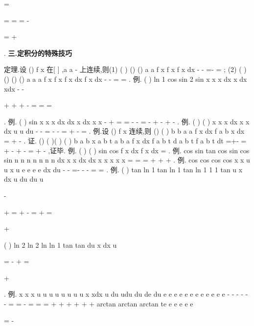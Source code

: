 \cdots 
=

=
=
=
-

=
+

\int 
\int 
. 
\vspace{4pt}
{\bfseries \textcolor{lyred}{三.定积分的特殊技巧}}

\textcolor{lyred}{定理}.设
()
f x 在[
]
,a a
-
上连续,则(1)
(
)
()
()
a
a
f
x
f x
f x dx
-
-
=-
\Rightarrow 
=
\int 
; 
(2)
(
)
()
()
()
a
a
a
f
x
f x
f x dx
f x dx
-
-
=
\Rightarrow 
=
\int 
\int 
. 
\textcolor{lyred}{例}.
(
)
ln
1 cos
sin
2 sin
x
x
x dx
x dx
xdx
\pi 
\pi 
\pi 
\pi 
\pi 
-
-


+
+
+
-
=
=
=




\int 
\int 
\int 
. 
\textcolor{lyred}{例}.
(
)
sin
x
x
x
dx
dx
x
dx
x
x
\pi 
-
+
=
=
-
-
=
-
+
-
+
-
\int 
\int 
\int 
. 
\textcolor{lyred}{例}.
(
)
(
)
x
x
x dx
x
x
dx
u
u du
\pi 
-
-
=
-
-
=
+
-
=
\int 
\int 
\int 
. 
\textcolor{lyred}{例}.设
()
f x 连续,则
()
(
)
b
b
a
a
f x dx
f a
b
x dx
=
+
-
\int 
\int 
. 
证.
()
(
)(
)
(
)
b
a
b
x a b t
a
b
a
f x dx
f a
b
t d a
b
t
f a
b
t dt
=+-
=
+
-
+
-
=
+
-
\int 
\int 
\int 
,证毕. 
\textcolor{lyred}{例}.
(
)
(
)
sin
cos
f
x dx
f
x dx
\pi 
\pi 
=
\int 
\int 
. 
\textcolor{lyred}{例}.
cos
sin
tan
cos
sin
cos
sin
n
n
n
n
n
n
n
dx
x
x
dx
dx
x
x
x
x
x
\pi 
\pi 
\pi 
\pi 
=
=
=
+
+
+
\int 
\int 
\int 
. 
\textcolor{lyred}{例}.
cos
cos
cos
cos
x
x
u
u
x
u
e
e
e
e
dx
du
\pi 
\pi 
\pi 
-
-
=-
-
-
=
=
\int 
\int 
. 
\textcolor{lyred}{例}.
(
)
tan
ln 1
tan
ln 1
tan
ln 1
1 1 tan
u
x dx
u
du
du
u
\pi 
\pi 
\pi 
\pi 


-




+
=
+
-
=
+
=






+\cdots 






\int 
\int 
\int 
(
)
ln 2
ln 2
ln
ln 1
tan
tan
du
x dx
u
\pi 
\pi 
\pi 
\pi 


=
-
+
=


+


\int 
\int 
. 
\textcolor{lyred}{例}.
x
x
x
u
u
u
u
u
u
u
u
x
xdx
u
du
udu
du
de
du
e
e
e
e
e
e
e
e
e
e
e
e
-
-
-
-
-
-
=
=
-
=
=
=
+
+
+
+
+
+
\int 
\int 
\int 
\int 
\int 
\int 
arctan
arctan
arctan
te
e
e
e
e
e




=
-








